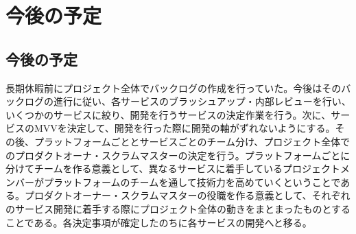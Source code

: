 \chapter{今後の予定}
\section{今後の予定}

長期休暇前にプロジェクト全体でバックログの作成を行っていた。今後はそのバックログの進行に従い、各サービスのブラッシュアップ・内部レビューを行い、いくつかのサービスに絞り、開発を行うサービスの決定作業を行う。次に、サービスのMVVを決定して、開発を行った際に開発の軸がずれないようにする。その後、プラットフォームごととサービスごとのチーム分け、プロジェクト全体でのプロダクトオーナ・スクラムマスターの決定を行う。プラットフォームごとに分けてチームを作る意義として、異なるサービスに着手しているプロジェクトメンバーがプラットフォームのチームを通して技術力を高めていくということである。プロダクトオーナー・スクラムマスターの役職を作る意義として、それぞれのサービス開発に着手する際にプロジェクト全体の動きをまとまったものとすることである。各決定事項が確定したのちに各サービスの開発へと移る。

